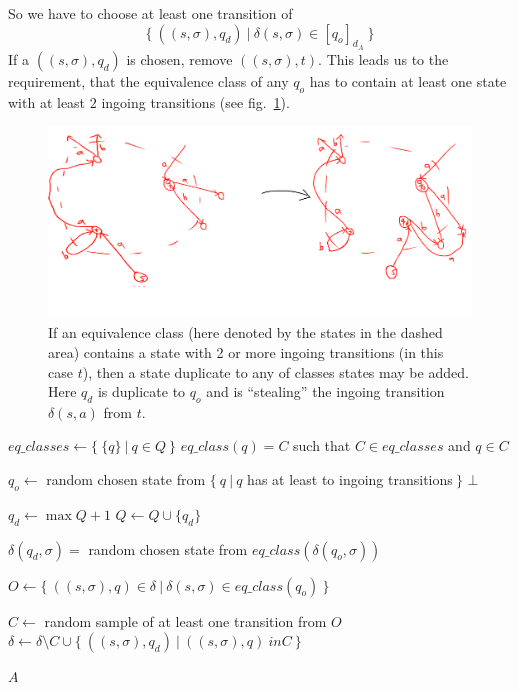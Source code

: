 So we have to choose at least one transition of
\[
	\{\ ((s, \sigma), q_d)\ |\ \delta(s,\sigma) \in [q_o]_{d_A}\ \}
\]
If a $((s, \sigma), q_d)$ is chosen, remove $((s, \sigma), t)$. This leads us to the requirement, that the equivalence class of any $q_o$ has to contain at least one state with at least $2$ ingoing transitions (see fig.~\ref{fig:dfa_add_duplicate_states}).
\begin{figure}
	\includegraphics[width=\linewidth]{images/dfa_add_duplicate_states.png}
	\caption{If an equivalence class (here denoted by the states in the dashed area) contains a state with 2 or more ingoing transitions (in this case $t$), then a state duplicate to any of classes states may be added. Here $q_d$ is duplicate to $q_o$ and is ``stealing'' the ingoing transition $\delta(s, a)$ from $t$.}
	\label{fig:dfa_add_duplicate_states}
\end{figure}

\vspace{0.2cm}
\begin{algorithmic}[1]
	\State $eq\_classes \gets \{\ \{q\}\ |\ q \in Q\ \}$
	\State $eq\_class(q) = C$ such that $C \in eq\_classes$ and $q \in C$
	\State
	
		\State
		\State $q_o \gets$ random chosen state from $\{\ q\ |\ q$ has at least to ingoing transitions$\ \}$
			\State \Return $\bot$
		\EndIf
		
		\State
		\State $q_d \gets \max Q + 1$
		\State $Q \gets Q \cup \{ q_d \}$
		
		\State
			\State $\delta(q_d, \sigma) =$ random chosen state from $eq\_class(\delta(q_o, \sigma))$
		\EndFor
		
		\State
		\State $O \gets \{\ ((s, \sigma), q) \in \delta\ |\ \delta(s,\sigma) \in eq\_class(q_o)\ \}$
		
		\State $C \gets$ random sample of at least one transition from $O$
		\State $\delta \gets \delta \setminus C \cup \{\ ((s, \sigma), q_d)\ |\ ((s, \sigma), q) \ in C\ \}$
	\EndFor
	
	\State \Return $A$
	\EndFunction
\end{algorithmic}
\vspace{0.2cm}

